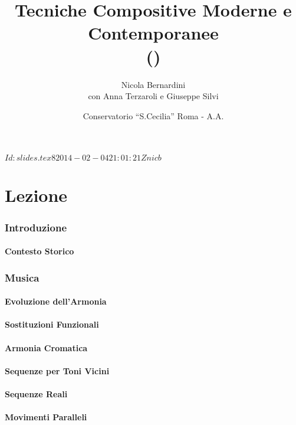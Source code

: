 \documentclass[\printmode,compress,xcolor=dvipsnames]{beamer}
\title[TCMC \lectnum]
{%
  Tecniche Compositive Moderne e Contemporanee \lectnum\\
	{\tiny (\rcstag)}
}
\author{%
	Nicola Bernardini\\con Anna Terzaroli e Giuseppe Silvi\\
	{\tiny \href{mailto:\cpholderemail}{\cpholderemail}}
}
\date[Roma \AnnoAccademico]{Conservatorio ``S.Cecilia'' Roma - A.A. \AnnoAccademico}
\begin{document}
\svnInfo $Id: slides.tex 8 2014-02-04 21:01:21Z nicb $
  

\begin{frame}
	\titlepage
\end{frame}
  
\part{Lezione }
\section{Introduzione}
\subsection[Contesto]{Contesto Storico}
\section{Musica}
\subsection[Armonia]{Evoluzione dell'Armonia}
\subsection[Sostituzioni]{Sostituzioni Funzionali}
\subsection[Cromatismo]{Armonia Cromatica}
\subsection[Toni Vicini]{Sequenze per Toni Vicini}
\subsection[Seq. Reali]{Sequenze Reali}
\subsection[Mov. Paralleli]{Movimenti Paralleli}
\end{document}
